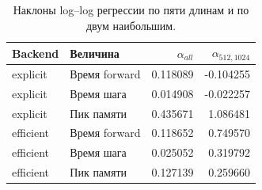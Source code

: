 \begin{table}[H]\centering\small
\setlength{\tabcolsep}{4pt}
\caption{Наклоны log--log регрессии по пяти длинам и по двум наибольшим.}\label{tab:slopes}
\begin{tabular}{llrr}
\toprule
Backend & Величина & $\alpha_{all}$ & $\alpha_{512,1024}$ \\
\midrule
explicit & Время forward & 0.118089 & -0.104255 \\
explicit & Время шага & 0.014908 & -0.022257 \\
explicit & Пик памяти & 0.435671 & 1.086481 \\
efficient & Время forward & 0.118652 & 0.749570 \\
efficient & Время шага & 0.025052 & 0.319792 \\
efficient & Пик памяти & 0.127139 & 0.259660 \\
\bottomrule
\end{tabular}
\end{table}
